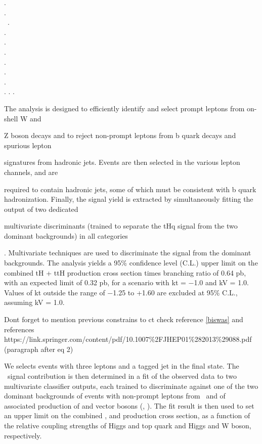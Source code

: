 .\\
.\\\
.\\
.\\
.\\
.\\
.\\
.\\
.\\
.
.
.




The analysis is designed to efficiently identify and select prompt leptons from on-shell W and

Z boson decays and to reject non-prompt leptons from b quark decays and spurious lepton

signatures from hadronic jets. Events are then selected in the various lepton channels, and are

required to contain hadronic jets, some of which must be consistent with b quark hadronization. Finally, the signal yield is extracted by simultaneously fitting the output of two dedicated

multivariate discriminants (trained to separate the tHq signal from the two dominant backgrounds) in all categories








. Multivariate techniques are used to discriminate the signal from the dominant backgrounds. The analysis yields a 95\% confidence level (C.L.) upper limit on the combined tH + ttH production cross section times branching ratio of 0.64 pb, with an expected limit of 0.32 pb, for a scenario with kt = −1.0 and kV = 1.0. Values of kt outside the range of −1.25 to +1.60 are excluded at 95\% C.L., assuming kV = 1.0.

Dont forget to mention previous constrains to ct check reference \ref{biswas} and references https://link.springer.com/content/pdf/10.1007\%2FJHEP01\%282013\%29088.pdf (paragraph after eq 2)


\noindent We selects events with three leptons and a \bjet tagged jet in the final state. The \tHq \ signal contribution is then determined in a fit of the observed data to two multivariate classifier outputs, each trained to discriminate against one of the two dominant backgrounds of events with non-prompt leptons from \ttbar\ and of associated production of \ttbar and vector bosons (\ttW, \ttZ). The fit result is then used to set an upper limit on the combined \ttH, \tHq and \tHW production cross section, as a function of the relative coupling strengths of Higgs and top quark and Higgs and W boson, respectively.
























